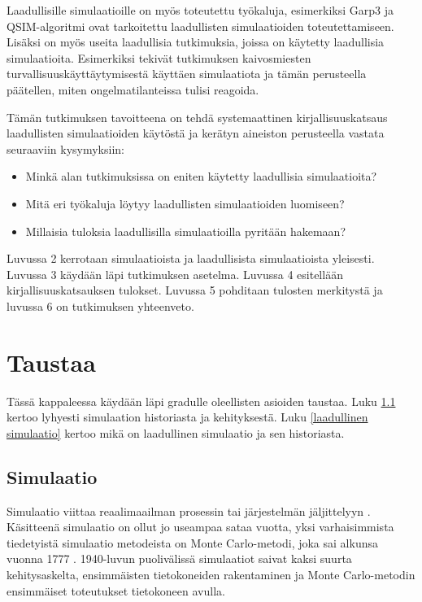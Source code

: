 \documentclass[utf8]{gradu3}
\begin{document}
Laadullisille simulaatioille on myös toteutettu työkaluja, esimerkiksi Garp3 \parencite{bredeweg2007garp3} ja QSIM-algoritmi \parencite{helgstrand2004qsim} ovat tarkoitettu laadullisten simulaatioiden toteutettamiseen. Lisäksi on myös useita laadullisia tutkimuksia, joissa on käytetty laadullisia simulaatioita. Esimerkiksi \cite{cao2019depth} tekivät tutkimuksen kaivosmiesten turvallisuuskäyttäytymisestä käyttäen simulaatiota ja tämän perusteella päätellen, miten ongelmatilanteissa tulisi reagoida. 

Tämän tutkimuksen tavoitteena on tehdä systemaattinen kirjallisuuskatsaus laadullisten simulaatioiden käytöstä ja kerätyn aineiston perusteella vastata seuraaviin kysymyksiin:
\begin{itemize}
    \item Minkä alan tutkimuksissa on eniten käytetty laadullisia simulaatioita?
    \item Mitä eri työkaluja löytyy laadullisten simulaatioiden luomiseen?
    \item Millaisia tuloksia laadullisilla simulaatioilla pyritään hakemaan?
\end{itemize}

Luvussa 2 kerrotaan simulaatioista ja laadullisista simulaatioista yleisesti. Luvussa 3 käydään läpi tutkimuksen asetelma. Luvussa 4 esitellään kirjallisuuskatsauksen tulokset. Luvussa 5 pohditaan tulosten merkitystä ja luvussa 6 on tutkimuksen yhteenveto.

\chapter{Taustaa}
Tässä kappaleessa käydään läpi gradulle oleellisten asioiden taustaa. Luku \ref{simulaatio} kertoo lyhyesti simulaation historiasta ja kehityksestä. Luku \ref{laadullinen simulaatio} kertoo mikä on laadullinen simulaatio ja sen historiasta.

\section{Simulaatio} \label{simulaatio}
Simulaatio viittaa reaalimaailman prosessin tai järjestelmän jäljittelyyn \parencite{banks1999introduction}. Käsitteenä simulaatio on ollut jo useampaa sataa vuotta, yksi varhaisimmista tiedetyistä simulaatio metodeista on Monte Carlo-metodi, joka sai alkunsa vuonna 1777 \parencite{HistoryOfSimulation}. 1940-luvun puolivälissä simulaatiot saivat kaksi suurta kehitysaskelta, ensimmäisten tietokoneiden rakentaminen ja Monte Carlo-metodin ensimmäiset toteutukset tietokoneen avulla\parencite{HistoryOfSimulation}. 
\end{document}
